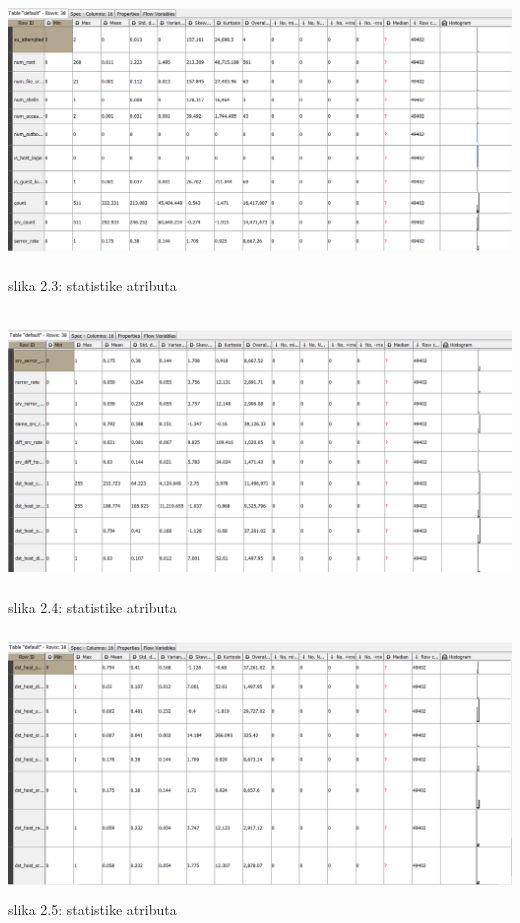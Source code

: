 \documentclass[10pt]{article}
\begin{document}
\begin{center}
\includegraphics[width = \textwidth,  height = 7.5cm]{slika3}
slika 2.3: statistike atributa\\
\end{center}

\begin{center}
\includegraphics[width = \textwidth,  height = 7.5cm]{slika4}
slika 2.4: statistike atributa\\
\end{center}

\begin{center}
\includegraphics[width = \textwidth,  height = 7cm]{slika5}
slika 2.5: statistike atributa\\
\end{center}
\end{document}
